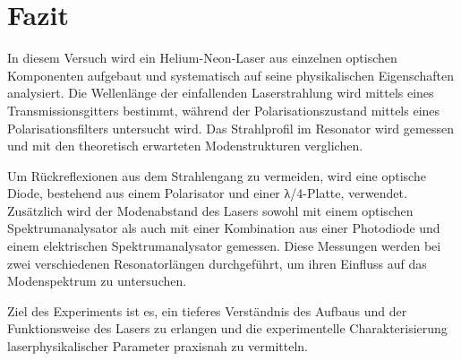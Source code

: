 \chapter{Fazit}
In diesem Versuch wird ein Helium-Neon-Laser aus einzelnen optischen Komponenten aufgebaut und systematisch auf seine physikalischen Eigenschaften analysiert. Die Wellenlänge der einfallenden Laserstrahlung wird mittels eines Transmissionsgitters bestimmt, während der Polarisationszustand mittels eines Polarisationsfilters untersucht wird. Das Strahlprofil im Resonator wird gemessen und mit den theoretisch erwarteten Modenstrukturen verglichen.

Um Rückreflexionen aus dem Strahlengang zu vermeiden, wird eine optische Diode, bestehend aus einem Polarisator und einer λ/4-Platte, verwendet. Zusätzlich wird der Modenabstand des Lasers sowohl mit einem optischen Spektrumanalysator als auch mit einer Kombination aus einer Photodiode und einem elektrischen Spektrumanalysator gemessen. Diese Messungen werden bei zwei verschiedenen Resonatorlängen durchgeführt, um ihren Einfluss auf das Modenspektrum zu untersuchen.

Ziel des Experiments ist es, ein tieferes Verständnis des Aufbaus und der Funktionsweise des Lasers zu erlangen und die experimentelle Charakterisierung laserphysikalischer Parameter praxisnah zu vermitteln.